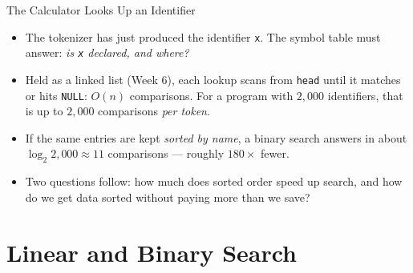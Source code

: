 \documentclass[aspectratio=169]{beamer}
\begin{document}
\begin{frame}{The Calculator Looks Up an Identifier}
  \begin{itemize}
    \item The tokenizer has just produced the identifier \texttt{x}. The
      symbol table must answer: \emph{is \texttt{x} declared, and where?}
    \item Held as a linked list (Week 6), each lookup scans from
      \texttt{head} until it matches or hits \texttt{NULL}: $O(n)$
      comparisons. For a program with $2{,}000$ identifiers, that is up to
      $2{,}000$ comparisons \emph{per token}.
    \item If the same entries are kept \emph{sorted by name}, a binary search
      answers in about $\log_2 2{,}000 \approx 11$ comparisons --- roughly
      $180\times$ fewer.
    \item Two questions follow: how much does sorted order speed up search,
      and how do we get data sorted without paying more than we save?
  \end{itemize}
  \vspace{-0.1cm}
\end{frame}


\section{Linear and Binary Search}

\end{document}
